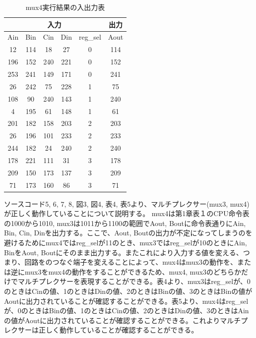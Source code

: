 \documentclass[12pt]{jreport}
\begin{document}
            \begin{table}[htb]
              \begin{center}
                \caption{mux4実行結果の入出力表}
                \begin{tabular} {|c|c|c|c|c|c|} \hline
                  \multicolumn{5}{|c|}{入力} & 出力 \\ \hline \hline
                        Ain & Bin & Cin & Din & reg\_sel & Aout \\ \hline
                        12 & 114 & 18 & 27 & 0 & 114 \\ \hline
                        196 & 152 & 240 & 221 & 0 & 152 \\ \hline
                        253 & 241 & 149 & 171 & 0 & 241 \\ \hline

                        26 & 242 & 75 & 228 & 1 & 75 \\ \hline
                        108 & 90 & 240 & 143 & 1 & 240 \\ \hline
                        4 &  195 & 61 & 148 & 1 & 61 \\ \hline

                        201 & 182 & 158 & 203 & 2 & 203 \\ \hline
                        26 & 196 & 101 & 233 & 2 & 233 \\ \hline
                        244 & 182 & 24 & 240 & 2 & 240 \\ \hline

                        178 & 221 & 111 & 31 & 3 & 178 \\ \hline
                        209 & 150 & 173 & 137 & 3 & 209 \\ \hline
                        71 & 173 & 160 & 86 & 3 & 71 \\ \hline

                \end{tabular}
              \end{center}
            \end{table}

            ソースコード5, 6, 7, 8, 図3, 図4, 表4, 表5より、マルチプレクサー(mux3, mux4)が正しく動作していることについて説明する。
            mux4は第1章表１のCPU命令表の1000から1010, mux3は1011から1100の範囲でAout, Boutに命令表通りにAin, Bin, Cin, Dinを出力する。ここで、Aout, Boutの出力が不定になってしまうのを避けるためにmux4ではreg\_selが11のとき、mux3ではreg\_selが10のときにAin, BinをAout, Boutにそのまま出力する。またこれにより入力する値を変える、つまり、回路をのつなぐ端子を変えることによって、mux4はmux3の動作を、または逆にmux3をmux4の動作をすることができるため、mux4, mux3のどちらかだけでマルチプレクサーを表現することができる。表4より、mux3はreg\_selが、0のときはCinの値、1のときはDinの値、2のときはBinの値、3のときはBinの値がAoutに出力されていることが確認することができる。表5より、mux4はreg\_selが、0のときはBinの値、1のときはCinの値、2のときはDinの値、3のときはAinの値がAoutに出力されていることが確認することができる。これよりマルチプレクサーは正しく動作していることが確認することができる。
\end{document}
